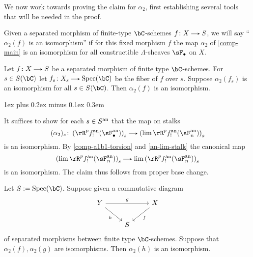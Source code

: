 \documentclass[11pt,leqno]{article}
\makeatletter
\newcommand{\thmheadfont}{\scshape}
\newcommand{\thmhorizspace}{0.3em}
\newcommand{\thmsep}{\hspace{\thmhorizspace}---}
\renewenvironment{proof}[1][Proof]{\par
  \pushQED{\qed}%
  \normalfont%
  \topsep1ex plus 0.2ex minus 0.1ex\relax%
  \labelsep \thmhorizspace\relax%
  \trivlist
  \item[\hskip\labelsep\thmheadfont#1\@addpunct{\thmsep}]\ignorespaces
}{%
  \popQED\endtrivlist\@endpefalse%
}
\theoremstyle{block}
\numberwithin{subblock}{block}
\numberwithin{equation}{subblock}
\newcommand{\arrlen}{1.25em}
\renewcommand{\to}{\mathrel{\tikz[baseline]%
    \draw[>=stealth,->](0,0.5ex)--(\arrlen,0.5ex);}}
\renewcommand{\l}{\left}
\renewcommand{\r}{\right}
\renewcommand{\c}{\colon}
\newcommand{\ce}{\mathrel{:=}}%
\newcommand{\Spec}{\operatorname{Spec}}
\numberwithin{block}{section}
\makeatother
\begin{document}
\begin{nothing}
  \label{comp-a2}
  We now work towards proving the claim for $\alpha_2$, first establishing several tools that will be needed in the proof.

  \begin{subterminology}
    \label{comp-a2-terminology}
    Given a separated morphism of finite-type $\bC$-schemes $f \c X \to S$, we will say ``$\alpha_2(f)$ is an isomorphism'' if for this fixed morphism $f$ the map $\alpha_2$ of \cref{comp-main} is an isomorphism for all constructible $\Lambda$-sheaves $\sF_\bullet$ on $X$.
  \end{subterminology}

  \begin{sublemma}
    \label{comp-a2-fiber}
    Let $f \c X \to S$ be a separated morphism of finite type $\bC$-schemes. For $s \in S(\bC)$ let $f_s \c X_s \to \Spec(\bC)$ be the fiber of $f$ over $s$. Suppose $\alpha_2(f_s)$ is an isomorphism for all $s \in S(\bC)$. Then $\alpha_2(f)$ is an isomorphism.
    
    \begin{proof}
      It suffices to show for each $s \in S^{\mathrm{an}}$ that the map on stalks
      \[
        (\alpha_2)_s \c \l(\rR^p f^\an_!(\sF_\bullet^\an)\r)_s \to \l(\lim \rR^pf^\an_!(\sF_n^\an)\r)_s
      \]
      is an isomorphism. By \cref{comp-a1b1-torsion} and \cref{an-lim-stalk} the canonical map
      \[
        \l(\lim \rR^pf^\an_!(\sF_n^\an)\r)_s \to \lim {\l(\rR^pf^\an_!(\sF_n^\an)\r)_s}
      \]
      is an isomorphism. The claim thus follows from proper base change.
    \end{proof}
  \end{sublemma}
  
  \begin{sublemma}
    \label{comp-a2-leray}
    Let $S \ce \Spec(\bC)$. Suppose given a commutative diagram
    \[
      \begin{tikzcd}
        Y \ar[rr, "g"] \ar[rd, "h", swap] &
        &
        X \ar[ld, "f"] \\
        &
        S
        &
      \end{tikzcd}
    \]
    of separated morphisms between finite type $\bC$-schemes. Suppose that $\alpha_2(f), \alpha_2(g)$ are isomorphisms. Then $\alpha_2(h)$ is an isomorphism.


\end{sublemma}
\end{nothing}
\end{document}
